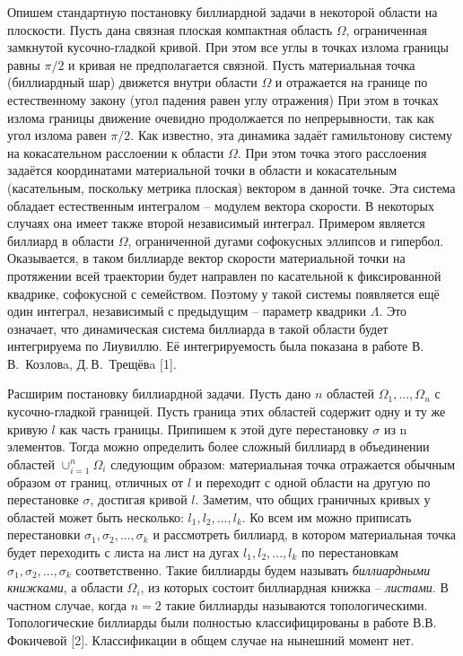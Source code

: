


\vzmscaption

Опишем стандартную постановку биллиардной задачи в некоторой области на плоскости. Пусть дана связная плоская компактная область $\Omega$, ограниченная замкнутой кусочно-гладкой кривой. При этом все углы в точках излома границы равны $\pi/2$ и кривая не предполагается связной.
Пусть материальная точка (биллиардный шар) движется внутри области $\Omega$ и отражается на границе по естественному закону
(угол падения равен углу отражения) При этом в точках излома границы движение очевидно продолжается по непрерывности, так как угол излома равен $ \pi/2 $.
Как известно, эта динамика задаёт гамильтонову систему на кокасательном расслоении к области $\Omega$.  При этом точка этого расслоения задаётся координатами материальной точки в области и кокасательным (касательным, поскольку метрика плоская) вектором в данной точке.
Эта система обладает естественным интегралом -- модулем вектора скорости. В некоторых случаях она имеет также
второй независимый интеграл. Примером является биллиард в области $\Omega$, ограниченной дугами софокусных эллипсов и гипербол. Оказывается, в таком биллиарде вектор скорости материальной точки на протяжении всей траектории будет направлен по касательной к фиксированной квадрике, софокусной с семейством. Поэтому у такой системы появляется ещё один интеграл, независимый с предыдущим -- параметр квадрики $ \Lambda $. Это означает, что динамическая система биллиарда в такой области будет интегрируема по Лиувиллю. Её интегрируемость была показана в работе В.\,В.~Козловa, Д.\,В.~Трещёвa [1].

Расширим постановку биллиардной задачи. Пусть дано $n$ областей $\Omega_1, ... ,\Omega_n$ с кусочно-гладкой границей.
Пусть граница этих областей содержит одну и ту же кривую $l$ как часть границы. Припишем к этой дуге перестановку $ \sigma $ из n элементов. Тогда можно определить более сложный биллиард в объединении областей $\cup_{i = 1}^n \Omega_i$ следующим образом: материальная точка отражается обычным образом от границ, отличных от $l$ и переходит с одной области на другую по перестановке $ \sigma $, достигая кривой $l$. Заметим, что общих граничных кривых у областей может быть несколько: $ l_1, l_2, ..., l_k $. Ко всем им можно приписать перестановки $ \sigma_1, \sigma_2, ..., \sigma_k $  и рассмотреть биллиард, в котором материальная точка будет переходить с листа на лист на дугах $ l_1, l_2, ..., l_k $ по перестановкам $ \sigma_1, \sigma_2, ..., \sigma_k $ соответственно. Такие биллиарды будем называть \textit{биллиардными книжками}, а области $ \Omega_i $,  из которых состоит биллиардная книжка -- \textit{листами}. В частном случае, когда $ n = 2 $ такие биллиарды называются топологическими. Топологические биллиарды были полностью классифицированы в работе В.В.\,Фокичевой [2]. Классификации в общем случае на нынешний момент нет.

